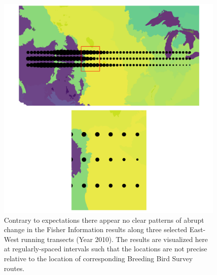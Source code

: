 \documentclass[12pt,twoside,openany]{reedthesis}
\begin{document}
\begin{figure}[bth]

{\centering \includegraphics[width=0.85\linewidth]{./chapterFiles/fisherSpatial/figures/figsCalledInDiss/scaledFiInterpolated_year2010_zoom_East-West} 

}

\caption{Contrary to expectations there appear no clear patterns of abrupt change in the Fisher Information results along three selected East-West running transects  (Year 2010). The results are visualized here at regularly-spaced intervals such that the locations are not precise relative to the location of corresponding Breeding Bird Survey routes.}\label{fig:fiEcoregion}
\end{figure}
\end{document}
